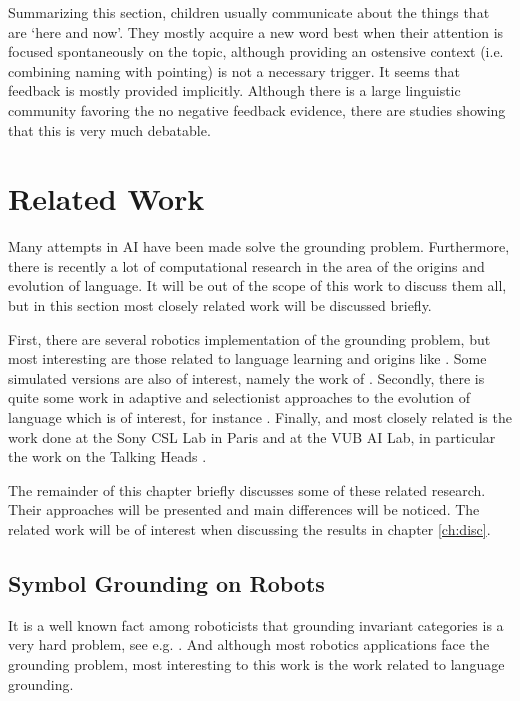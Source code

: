 \p
Summarizing this section, children usually communicate about the things that are `here and now'. They mostly acquire a new word best when their attention is focused spontaneously on the topic, although providing an ostensive context (i.e. combining naming with pointing) is not a necessary trigger. It seems that feedback is mostly provided implicitly. Although there is a large linguistic community favoring the no negative feedback evidence, there are studies showing that this is very much debatable.


\section{Related Work}\label{s:theory:otherwork}

Many attempts in AI have been made solve the grounding problem. Furthermore, there is recently a lot of computational research in the area of the origins and evolution of language. It will be out of the scope of this work to discuss them all, but in this section most closely related work will be discussed briefly. 

First, there are several robotics implementation of the grounding problem, but most interesting are those related to language learning and origins like \cite{yancostein,billard:1997a,rosenstein:1998a}. Some simulated versions are also of interest, namely the work of \cite{cangelosiparisi:1998,cangelosi:1998}. Secondly, there is quite some work in adaptive and selectionist approaches to the evolution of language which is of interest, for instance \cite{wernerdyer:1991,kirby:1997,oliphant:1998}. Finally, and most closely related is the work done at the Sony CSL Lab in Paris and at the VUB AI Lab, in particular the work on the Talking Heads \cite{belpaeme:1998,kaplan:2000,steels:2000}.

The remainder of this chapter briefly discusses some of these related research. Their approaches will be presented and main differences will be noticed. The related work will be of interest when discussing the results in chapter \ref{ch:disc}.

\subsection{Symbol Grounding on Robots}

It is a well known fact among roboticists that grounding invariant categories is a very hard problem, see e.g. \cite{pfeiferscheier:1999}. And although most robotics applications face the grounding problem, most interesting to this work is the work related to language grounding.

